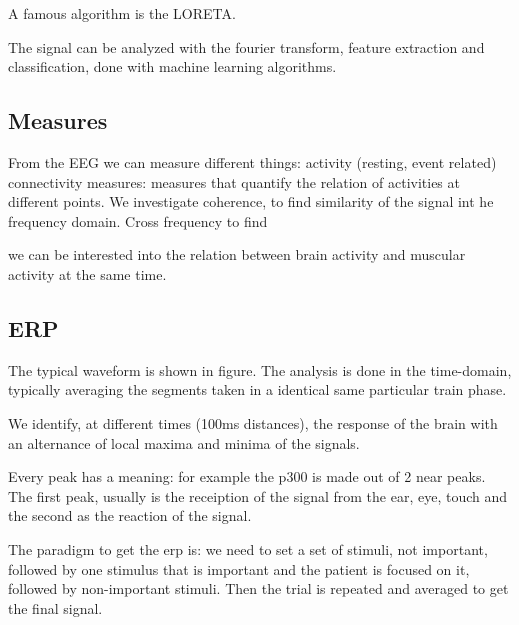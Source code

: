  A famous algorithm is the LORETA.

 The signal can be analyzed with the fourier transform, feature extraction and classification, done with machine learning algorithms.

\subsection{Measures}
From the EEG we can measure different things:
activity (resting, event related)
connectivity measures: measures that quantify the relation of activities at different points. We investigate coherence, to find similarity of the signal int he frequency domain. Cross frequency to find

we can be interested into the relation between brain activity and muscular activity at the same time.

\subsection{ERP}
The typical waveform is shown in figure. The analysis is done in the time-domain, typically averaging the segments taken in a identical same particular train phase.

We identify, at different times (100ms distances), the response of the brain with an alternance of local maxima and minima of the signals.

Every peak has a meaning: for example the p300 is made out of 2 near peaks.
The first peak, usually is the receiption of the signal from the ear, eye, touch and the second as the reaction of the signal.

The paradigm to get the erp is:
we need to set a set of stimuli, not important, followed by one stimulus that is important and the patient is focused on it, followed by non-important stimuli. Then the trial is repeated and averaged to get the final signal.
